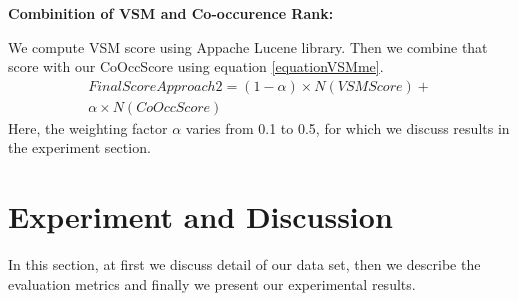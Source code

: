 \documentclass[conference]{IEEEtran}
\begin{document}
\textbf{Combinition of VSM and Co-occurence Rank:}

We compute VSM score using Appache Lucene library. Then we combine that score with our CoOccScore using equation \ref{equationVSMme}.
\begin{multline}\label{equationVSMme}
FinalScoreApproach2=(1-\alpha )\times N(VSMScore)+ \\
\alpha \times N(CoOccScore)
\end{multline}
Here, the weighting factor $\alpha$ varies from 0.1 to 0.5, for which we discuss results in the experiment section.

\section{Experiment and Discussion}
In this section, at first we discuss detail of our data set, then we describe the evaluation metrics and finally we present our experimental results.



\end{document}
